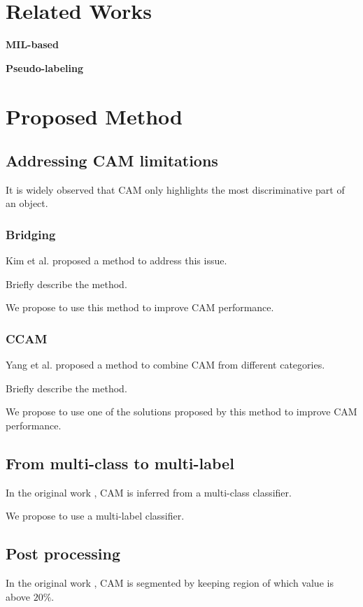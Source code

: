 \documentclass[conference]{IEEEtran}
\begin{document}
\section{Related Works}
\textbf{MIL-based}

\textbf{Pseudo-labeling}

\section{Proposed Method}
\subsection{Addressing CAM limitations}
It is widely observed that CAM only highlights the most discriminative part of an object.

\subsubsection{Bridging}

Kim et al. \cite{kim2022bridging} proposed a method to address this issue.

Briefly describe the method.

We propose to use this method to improve CAM performance.

\subsubsection{CCAM}

Yang et al. \cite{yang2019combinational} proposed a method to combine CAM from different categories.

Briefly describe the method.

We propose to use one of the solutions proposed by this method to improve CAM performance.

\subsection{From multi-class to multi-label}
In the original work \cite{zhou2015cnnlocalization}, CAM is inferred from a multi-class classifier.

We propose to use a multi-label classifier.

\subsection{Post processing}
In the original work \cite{zhou2015cnnlocalization}, CAM is segmented by keeping region of which value is above $20\%$.
\end{document}
